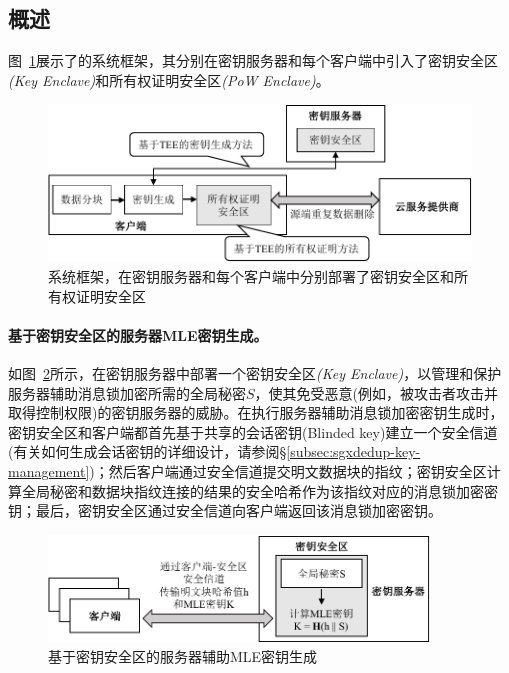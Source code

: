 \subsection{概述}
\label{subsec:sgxdedup-arch}

图~\ref{fig:sgxdedup-overview}展示了\sysnameS 的系统框架，其分别在密钥服务器和每个客户端中引入了密钥安全区\textit{(Key Enclave)}和所有权证明安全区\textit{(PoW Enclave)}。

\begin{figure}[!htb]
    \centering
    \includegraphics[width=\textwidth]{pic/sgxdedup/sgxdedup-arch.pdf}
    \caption{\sysnameS 系统框架，在密钥服务器和每个客户端中分别部署了密钥安全区和所有权证明安全区}
    \label{fig:sgxdedup-overview}
\end{figure}

\paragraph*{基于密钥安全区的服务器MLE密钥生成。}如图~\ref{fig:sgxdedup-overview-key}所示，\sysnameS 在密钥服务器中部署一个密钥安全区\textit{(Key Enclave)}，以管理和保护服务器辅助消息锁加密所需的全局秘密$S$，使其免受恶意(例如，被攻击者攻击并取得控制权限)的密钥服务器的威胁。在执行服务器辅助消息锁加密密钥生成时，密钥安全区和客户端都首先基于共享的会话密钥(Blinded key)建立一个安全信道(有关如何生成会话密钥的详细设计，请参阅\S\ref{subsec:sgxdedup-key-management})；然后客户端通过安全信道提交明文数据块的指纹；密钥安全区计算全局秘密和数据块指纹连接的结果的安全哈希作为该指纹对应的消息锁加密密钥；最后，密钥安全区通过安全信道向客户端返回该消息锁加密密钥。

\begin{figure}[!htb]
    \centering
    \includegraphics[width=0.9\textwidth]{pic/sgxdedup/key-enclave.pdf}
    \caption{基于密钥安全区的服务器辅助MLE密钥生成}
    \label{fig:sgxdedup-overview-key}
\end{figure}

